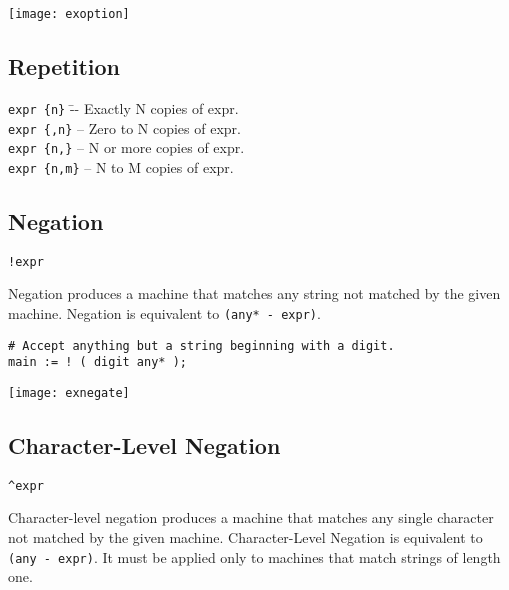 \documentclass[letterpaper,11pt,oneside]{book}
\newcommand{\verbspace}{\vspace{10pt}}
\newcommand{\graphspace}{\vspace{10pt}}
\newenvironment{inline_code}{\def\baselinestretch{1}\vspace{12pt}\small}{}
\begin{document}
\graphspace
\begin{center}
\texttt{[image: exoption]}
\end{center}
\graphspace


\subsection{Repetition}

\begin{tabbing}
\noindent \verb|expr {n}| \hspace{16pt}\=-- Exactly N copies of expr.\\

\noindent \verb|expr {,n}| \>-- Zero to N copies of expr.\\

\noindent \verb|expr {n,}| \>-- N or more copies of expr.\\

\noindent \verb|expr {n,m}| \>-- N to M copies of expr.
\end{tabbing}

\subsection{Negation}

\verb|!expr|
\verbspace

Negation produces a machine that matches any string not matched by the given
machine. Negation is equivalent to \verb|(any* - expr)|.

\begin{inline_code}
\begin{verbatim}
# Accept anything but a string beginning with a digit.
main := ! ( digit any* );
\end{verbatim}
\end{inline_code}

\graphspace
\begin{center}
\texttt{[image: exnegate]}
\end{center}
\graphspace


\subsection{Character-Level Negation}

\verb|^expr|
\verbspace

Character-level negation produces a machine that matches any single character
not matched by the given machine. Character-Level Negation is equivalent to
\verb|(any - expr)|. It must be applied only to machines that match strings of
length one.
\end{document}
